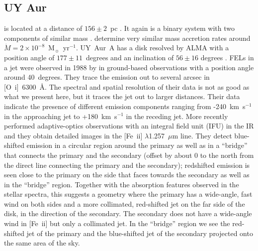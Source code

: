 \documentclass[twocolumn]{aastex62}
\begin{document}
\subsection{UY Aur}

 is  located at a distance of $156\pm2$~pc \citep{2016A&A...595A...1G,2018A&A...616A...1G}. It again is a binary system with two components of similar mass \citep[M0 and M2, see][]{2003ApJ...583..334H}. \citet{2003ApJ...583..334H} determine very similar mass accretion rates around $\dot M=2\times10^{-8}$~M$_{\sun}$~yr$^{-1}$.
UY~Aur~A has a disk resolved by ALMA with a position angle of $177\pm11$~degrees and an inclination of $56\pm16$ degrees \citep{2014ApJ...784...62A}. FELs in a jet were observed in 1988 by \citet{1997A&AS..126..437H} in ground-based observations with a position angle around 40~degrees. They trace the emission out to several arcsec in [O~{\sc i}]~6300~\AA{}. The spectral and spatial resolution of their data is not as good as what we present here, but it traces the jet out to larger distances. Their data indicate the presence of different emission components ranging from -240~km~s$^{-1}$ in the approaching jet to +180~km~s$^{-1}$ in the receding jet. More recently \citet{2014ApJ...786...63P} performed adaptive-optics observations with an integral field unit (IFU) in the IR and they obtain detailed images in the [Fe~{\sc ii}] $\lambda$1.257~$\mu$m line. They detect blue-shifted emission in a circular region around the primary as well as in a ``bridge'' that connects the primary and the secondary (offset by about 0 to the north from the direct line connecting the primary and the secondary); redshifted emission is seen close to the primary on the side that faces towards the secondary as well as in the ``bridge'' region. Together with the absorption features observed in the stellar spectra, this suggests a geometry where the primary has a wide-angle, fast wind on both sides and a more collimated, red-shifted jet on the far side of the disk, in the direction of the secondary. The secondary does not have a wide-angle wind in [Fe~{\sc ii}] but only a collimated jet. In the ``bridge'' region we see the red-shifted jet of the primary and the blue-shifted jet of the secondary projected onto the same area of the sky.
\end{document}
